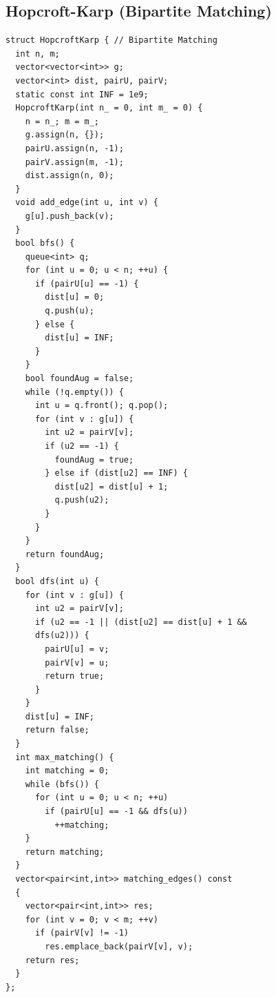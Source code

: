 \subsection{Hopcroft-Karp (Bipartite Matching)}
\begin{verbatim}
struct HopcroftKarp { // Bipartite Matching
  int n, m;
  vector<vector<int>> g;
  vector<int> dist, pairU, pairV;
  static const int INF = 1e9;
  HopcroftKarp(int n_ = 0, int m_ = 0) {
    n = n_; m = m_;
    g.assign(n, {});
    pairU.assign(n, -1);
    pairV.assign(m, -1);
    dist.assign(n, 0);
  }
  void add_edge(int u, int v) {
    g[u].push_back(v);
  }
  bool bfs() {
    queue<int> q;
    for (int u = 0; u < n; ++u) {
      if (pairU[u] == -1) {
        dist[u] = 0;
        q.push(u);
      } else {
        dist[u] = INF;
      }
    }
    bool foundAug = false;
    while (!q.empty()) {
      int u = q.front(); q.pop();
      for (int v : g[u]) {
        int u2 = pairV[v];
        if (u2 == -1) {
          foundAug = true;
        } else if (dist[u2] == INF) {
          dist[u2] = dist[u] + 1;
          q.push(u2);
        }
      }
    }
    return foundAug;
  }
  bool dfs(int u) {
    for (int v : g[u]) {
      int u2 = pairV[v];
      if (u2 == -1 || (dist[u2] == dist[u] + 1 &&
      dfs(u2))) {
        pairU[u] = v;
        pairV[v] = u;
        return true;
      }
    }
    dist[u] = INF;
    return false;
  }
  int max_matching() {
    int matching = 0;
    while (bfs()) {
      for (int u = 0; u < n; ++u)
        if (pairU[u] == -1 && dfs(u))
          ++matching;
    }
    return matching;
  }
  vector<pair<int,int>> matching_edges() const
  {
    vector<pair<int,int>> res;
    for (int v = 0; v < m; ++v)
      if (pairV[v] != -1)
        res.emplace_back(pairV[v], v);
    return res;
  }
};
\end{verbatim}
